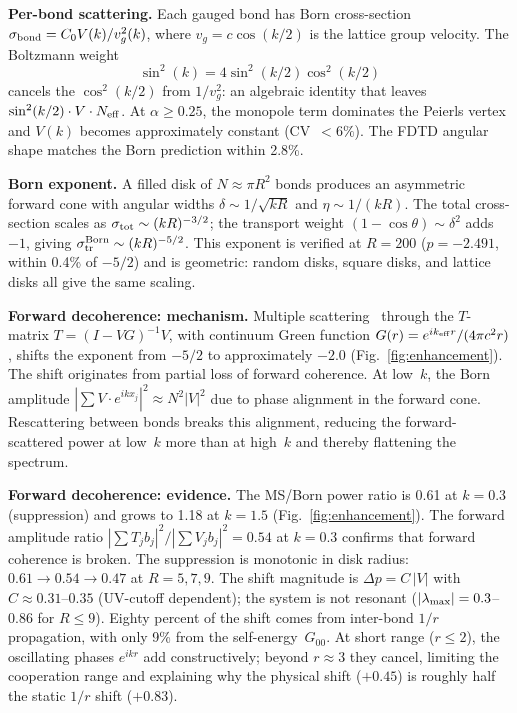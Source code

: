 \documentclass[aps,prl,twocolumn,superscriptaddress]{revtex4-2}
\begin{document}
\textbf{Per-bond scattering.}
Each gauged bond has Born cross-section
$\sigma_{\rm bond} = C_0 V(k)/v_g^2(k)$, where $v_g = c\cos(k/2)$
is the lattice group velocity. The Boltzmann weight
%
$$\sin^2(k) = 4\sin^2(k/2)\cos^2(k/2)$$
%
cancels the $\cos^2(k/2)$ from $1/v_g^2$: an algebraic identity that leaves
$\sin^2(k/2) \cdot V \cdot N_{\rm eff}$. At $\alpha \geq 0.25$, the
monopole term dominates the Peierls vertex and $V(k)$ becomes approximately
constant (CV~$< 6\%$). The FDTD angular shape matches the Born prediction
within 2.8\%.

\textbf{Born exponent.}
A filled disk of $N \approx \pi R^2$ bonds produces an asymmetric forward
cone with angular widths $\delta \sim 1/\sqrt{kR}$ and
$\eta \sim 1/(kR)$. The total cross-section scales as
$\sigma_{\rm tot} \sim (kR)^{-3/2}$; the transport weight
$(1-\cos\theta) \sim \delta^2$ adds $-1$, giving
$\sigma_{\rm tr}^{\rm Born} \sim (kR)^{-5/2}$. This exponent is verified at
$R = 200$ ($p = -2.491$, within 0.4\% of $-5/2$) and is geometric: random
disks, square disks, and lattice disks all give the same scaling.

\textbf{Forward decoherence: mechanism.}
Multiple scattering~\cite{foldy1945} through the $T$-matrix
$T = (I - VG)^{-1}V$, with continuum Green function
$G(r) = e^{ik_{\rm eff}r}/(4\pi c^2 r)$, shifts the exponent from $-5/2$
to approximately $-2.0$ (Fig.~\ref{fig:enhancement}). The shift originates
from partial loss of forward coherence. At low~$k$, the Born amplitude
$|\sum V \cdot e^{ikx_j}|^2 \approx N^2|V|^2$ due to phase alignment in
the forward cone. Rescattering between bonds breaks this alignment, reducing
the forward-scattered power at low~$k$ more than at high~$k$ and thereby
flattening the spectrum.

\textbf{Forward decoherence: evidence.}
The MS/Born power ratio is 0.61 at $k = 0.3$ (suppression) and grows to
1.18 at $k = 1.5$ (Fig.~\ref{fig:enhancement}). The forward amplitude ratio
$|\sum T_j b_j|^2/|\sum V_j b_j|^2 = 0.54$ at $k = 0.3$ confirms that
forward coherence is broken. The suppression is monotonic in disk radius:
$0.61 \to 0.54 \to 0.47$ at $R = 5, 7, 9$. The shift magnitude is
$\Delta p = C\,|V|$ with $C \approx 0.31$--$0.35$ (UV-cutoff dependent);
the system is not resonant ($|\lambda_{\rm max}| = 0.3$--$0.86$ for
$R \leq 9$). Eighty percent of the shift comes from inter-bond $1/r$
propagation, with only 9\% from the self-energy~$G_{00}$. At short range
($r \leq 2$), the oscillating phases $e^{ikr}$ add constructively; beyond
$r \approx 3$ they cancel, limiting the cooperation range and explaining why
the physical shift ($+0.45$) is roughly half the static $1/r$ shift
($+0.83$).
\end{document}
